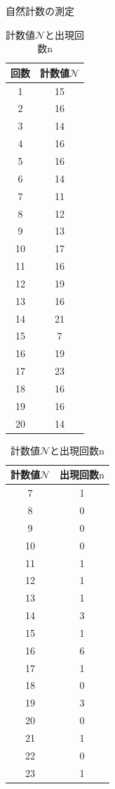 \documentclass{jarticle}
\begin{document}
\begin{table}[H]
  \begin{minipage}[t]{0.45\textwidth}
    \centering
    \caption{自然計数の測定}
    \label{tb:natural-count}
    \begin{tabular}{cc}
      \hline
      回数 & 計数値$\mathcal{N}$ \\
      \hline
      1 & 15 \\
      2 & 16 \\
      3 & 14 \\
      4 & 16 \\
      5 & 16 \\
      6 & 14 \\
      7 & 11 \\
      8 & 12 \\
      9 & 13 \\
      10 & 17 \\
      11 & 16 \\
      12 & 19 \\
      13 & 16 \\
      14 & 21 \\
      15 & 7 \\
      16 & 19 \\
      17 & 23 \\
      18 & 16 \\
      19 & 16 \\
      20 & 14 \\
      \hline
    \end{tabular}
  \end{minipage}
  \begin{minipage}[t]{0.45\textwidth}
    \centering
    \caption{計数値$\mathcal{N}$と出現回数$\mathrm{n}$}
    \label{tb:count-distribution}
    \begin{tabular}{cc}
      \hline
      計数値$\mathcal{N}$ & 出現回数$\mathrm{n}$ \\
      \hline
      7 & 1 \\
      8 & 0 \\
      9 & 0 \\
      10 & 0 \\
      11 & 1 \\
      12 & 1 \\
      13 & 1 \\
      14 & 3 \\
      15 & 1 \\
      16 & 6 \\
      17 & 1 \\
      18 & 0 \\
      19 & 3 \\
      20 & 0 \\
      21 & 1 \\
      22 & 0 \\
      23 & 1 \\
      \hline
    \end{tabular}
  \end{minipage}
\end{table}
\end{document}
